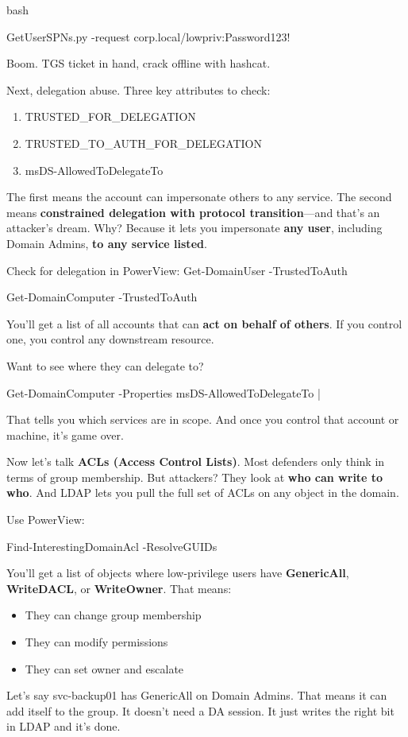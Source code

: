 bash

 

GetUserSPNs.py -request corp.local/lowpriv:Password123!

Boom. TGS ticket in hand, crack offline with hashcat.

Next, delegation abuse. Three key attributes to check:

\begin{enumerate}
    \item TRUSTED\_FOR\_DELEGATION

    \item TRUSTED\_TO\_AUTH\_FOR\_DELEGATION

    \item msDS-AllowedToDelegateTo

\end{enumerate}
The first means the account can impersonate others to any service. The second means \textbf{constrained delegation with protocol transition}—and that's an attacker’s dream. Why? Because it lets you impersonate \textbf{any user}, including Domain Admins, \textbf{to any service listed}.

Check for delegation in PowerView:
Get-DomainUser -TrustedToAuth

Get-DomainComputer -TrustedToAuth

You’ll get a list of all accounts that can \textbf{act on behalf of others}. If you control one, you control any downstream resource.

Want to see where they can delegate to?

Get-DomainComputer -Properties msDS-AllowedToDelegateTo |

That tells you which services are in scope. And once you control that account or machine, it’s game over.

Now let’s talk \textbf{ACLs (Access Control Lists)}. Most defenders only think in terms of group membership. But attackers? They look at \textbf{who can write to who}. And LDAP lets you pull the full set of ACLs on any object in the domain.

Use PowerView:

Find-InterestingDomainAcl -ResolveGUIDs

You’ll get a list of objects where low-privilege users have \textbf{GenericAll}, \textbf{WriteDACL}, or \textbf{WriteOwner}. That means:

\begin{itemize}
    \item They can change group membership

    \item They can modify permissions

    \item They can set owner and escalate

\end{itemize}
Let’s say svc-backup01 has GenericAll on Domain Admins. That means it can add itself to the group. It doesn’t need a DA session. It just writes the right bit in LDAP and it’s done.

